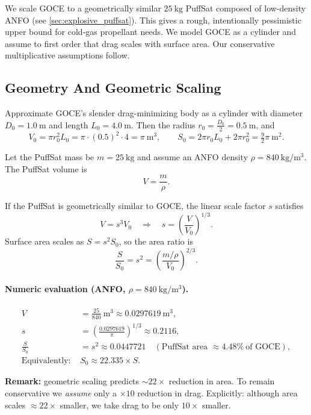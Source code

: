 \documentclass{article}
\begin{document}
We scale GOCE to a geometrically similar \(\SI{25}{\kg}\) PuffSat composed of low-density ANFO (see \autoref{sec:explosive_puffsat}). This gives a rough, intentionally pessimistic upper bound for cold-gas propellant needs. We model GOCE as a cylinder and assume to first order that drag scales with surface area. Our conservative multiplicative assumptions follow.

\subsection*{Geometry And Geometric Scaling}
Approximate GOCE's slender drag-minimizing body \cite{goce_dragfree} as a cylinder with diameter \(D_0=\SI{1.0}{\m}\) and length \(L_0=\SI{4.0}{\meter}\). Then the radius \(r_0=\tfrac{D_0}{2}=\SI{0.5}{\meter}\), and
\[
V_0 = \pi r_0^2 L_0 = \pi\cdot(0.5)^2\cdot 4 = \pi\ \mathrm{m^3},
\qquad
S_0 = 2\pi r_0 L_0 + 2\pi r_0^2 = \tfrac{9}{2}\pi\ \mathrm{m^2}.
\]

Let the PuffSat mass be \(m=\SI{25}{\kg}\) and assume an ANFO density
\(\rho=\SI{840}{\kg\per\m^3}\). The PuffSat volume is
\[
V=\frac{m}{\rho}.
\]

If the PuffSat is geometrically similar to GOCE, the linear scale factor \(s\) satisfies
\[
V = s^3 V_0
\quad\Longrightarrow\quad
s = \left(\frac{V}{V_0}\right)^{1/3}.
\]
Surface area scales as \(S = s^2 S_0\), so the area ratio is
\[
\frac{S}{S_0} = s^2 = \left(\frac{m/\rho}{V_0}\right)^{2/3}.
\]

\paragraph{Numeric evaluation (ANFO, \(\rho=\SI{840}{\kg\per\m^3}\)).}
\[
\begin{aligned}
V &= \frac{25}{840}\ \mathrm{m^3} \approx 0.0297619\ \mathrm{m^3},\\[4pt]
s &= \left(\frac{0.0297619}{\pi}\right)^{1/3} \approx 0.2116,\\[4pt]
\frac{S}{S_0} &= s^2 \approx 0.0447721 \quad(\text{PuffSat area } \approx 4.48\%\ \text{of GOCE}),\\[4pt]
\text{Equivalently: } & S_0 \approx 22.335 \times S.
\end{aligned}
\]

\noindent\textbf{Remark:} geometric scaling predicts \(\sim22\times\) reduction in area. To remain conservative we \emph{assume} only a \(\times 10\) reduction in drag. Explicitly: although area scales \(\approx22\times\) smaller, we take drag to be only \(10\times\) smaller.
\end{document}
